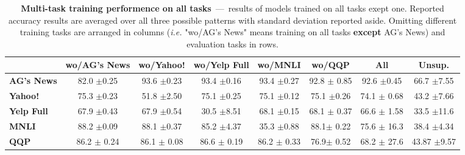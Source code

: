 \begin{table*}[ht]
	\centering
	\fontsize{9}{13}
	\selectfont
	\begin{tabular*}{\textwidth}{l@{\extracolsep{\fill}}ccccccc}
		\toprule
		& \textbf{wo/AG's News} & \textbf{wo/Yahoo!} & \textbf{wo/Yelp Full} & \textbf{wo/MNLI} & \textbf{wo/QQP} & \textbf{All} & \textbf{Unsup.} \\
		\hline
		\textbf{AG's News}    & 82.0 \tiny$\pm$0.25        & 93.6 \tiny$\pm$0.23        & 93.4   \tiny$\pm$0.16          & 93.4 \tiny$\pm$0.27       & 92.8 \tiny$\pm$ 0.85 & 92.6 \tiny$\pm$0.45 & 66.7 \tiny$\pm$7.55 \\
		\textbf{Yahoo!}     & 75.3 \tiny$\pm$0.23        & 51.8 \tiny$\pm$2.50        & 75.1   \tiny$\pm$0.25          & 75.1 \tiny$\pm$0.12       & 75.1 \tiny$\pm$0.26 & 74.1 \tiny$\pm$ 0.68  & 43.2 \tiny$\pm$7.66 \\
		\textbf{Yelp Full} & 67.9 \tiny$\pm$0.43        & 67.9 \tiny$\pm$0.54        & 30.5   \tiny$\pm$8.51          & 68.1 \tiny$\pm$0.15       & 68.1 \tiny$\pm$ 0.37 & 66.6 \tiny$\pm$ 1.58 & 33.5 \tiny$\pm$11.6 \\
		\textbf{MNLI}      & 88.2 \tiny$\pm$0.09        & 88.1 \tiny$\pm$0.37        & 85.2   \tiny$\pm$4.37          & 35.3 \tiny$\pm$0.88      & 88.1\tiny$\pm$ 0.22  & 75.6 \tiny$\pm$ 16.3 & 38.4 \tiny$\pm$4.34 \\
		\textbf{QQP}      &  86.2 \tiny$\pm$ 0.24        &  86.1 \tiny$\pm$ 0.08        &    86.6 \tiny$\pm$ 0.19          &  86.2 \tiny$\pm$ 0.33      & 76.9\tiny$\pm$ 0.52  & 68.2 \tiny$\pm$ 27.6 & 43.87 \tiny$\pm$9.57\\
		\bottomrule
	\end{tabular*}
	\caption{\textbf{Multi-task training performence on all tasks}~---~results of models trained on all tasks exept one. Reported accuracy results are averaged over all three possible patterns with standard deviation reported aside. Omitting different training tasks are arranged in columns (\textit{i.e.} "wo/AG's News" means training on all tasks \textbf{except} AG's News) and evaluation tasks in rows.}\label{tab:multi-on-train-set-summary}
	\vspace{-4mm}
\end{table*}

